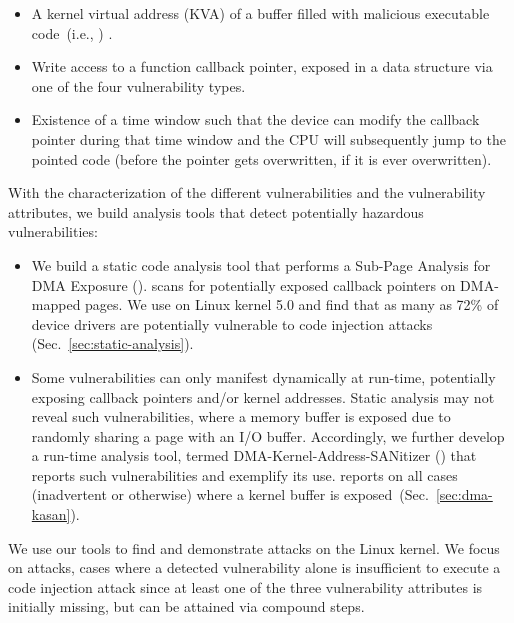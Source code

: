\begin{itemize}
    \item A kernel virtual address (KVA) of a buffer filled with malicious executable code~(i.e., \mabaf) .
    \item Write access to a function callback pointer, exposed in a data structure via one of the four \subpage vulnerability types. 
    \item Existence of a time window such that the device can modify the callback pointer during that time window and the CPU will subsequently jump to the pointed code (before the pointer gets overwritten, if it is ever overwritten). 
\end{itemize} 

With the characterization of the different \subpage{} vulnerabilities and the vulnerability attributes, we build analysis tools that detect potentially hazardous \subpage{} vulnerabilities:

\begin{itemize}
    \item We build a static code analysis tool that performs a Sub-Page Analysis for DMA Exposure (\tool). \tool scans for potentially exposed callback pointers on DMA-mapped pages. We use \tool on Linux kernel 5.0 and find that as many as 72\% of device drivers are potentially vulnerable to code injection attacks (Sec.~\ref{sec:static-analysis}). 

    \item Some \subpage{} vulnerabilities can only manifest dynamically at run-time, potentially exposing callback pointers and/or kernel addresses. Static analysis may not reveal such vulnerabilities, where a memory buffer is exposed due to randomly sharing a page with an I/O buffer. Accordingly, we further develop a run-time analysis tool, termed DMA-Kernel-Address-SANitizer (\dkasan) that reports such vulnerabilities and exemplify its use. \dkasan reports on all cases (inadvertent or otherwise) where a kernel buffer is exposed~(Sec.~\ref{sec:dma-kasan}).
\end{itemize}

We use our tools to find and demonstrate attacks on the Linux kernel. We focus on \compound attacks, cases where a detected \subpage vulnerability alone is insufficient to execute a code injection attack since at least one of the three vulnerability attributes is initially missing, but can be attained via compound steps. 

